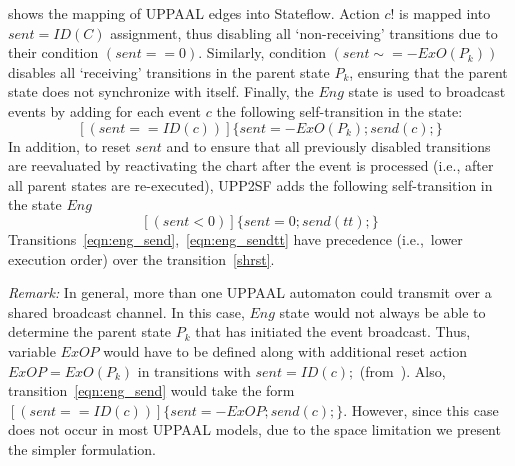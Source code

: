  shows the mapping of UPPAAL edges into Stateflow. Action $c!$ is mapped into $sent=ID(C)$ assignment, thus disabling all `non-receiving' transitions due to their condition $(sent==0)$. Similarly, condition $(sent\sim=-ExO(P_k))$ 
disables all `receiving' transitions in the parent state $P_k$, ensuring that the parent state does not synchronize with itself. Finally, the $Eng$ state is used to broadcast events by adding for each event $c$ the following self-transition in the state:
\begin{equation}
\label{eqn:eng_send}
[(sent==ID(c))]\{sent=-ExO(P_k);send(c);\}
\end{equation}
In addition, to reset $sent$ and to ensure that all previously disabled transitions are reevaluated by reactivating the chart after the event is processed (i.e., after all parent states are re-executed), UPP2SF adds the following self-transition in the state $Eng$
\begin{equation}
\label{eqn:eng_sendtt}
[(sent<0)]\{sent=0;send(tt);\}
\end{equation}
Transitions~\eqref{eqn:eng_send},~\eqref{eqn:eng_sendtt} have precedence (i.e.,~lower execution order) over the transition~\eqref{shrst}. 


\emph{Remark:} In general, more than one UPPAAL automaton could transmit over a shared broadcast channel. In this case, $Eng$ state would not always be able to determine the parent state $P_k$ that has initiated the event broadcast. Thus, variable $ExOP$ would have to be defined along with additional reset action $ExOP=ExO(P_k)$ in transitions with $sent=ID(c);$ (from~). Also, transition~\eqref{eqn:eng_send} would take the form $[(sent==ID(c))]\{sent=-ExOP;send(c);\}$. However, since this case does not occur in most UPPAAL models, due to the space limitation we present the simpler formulation. 




